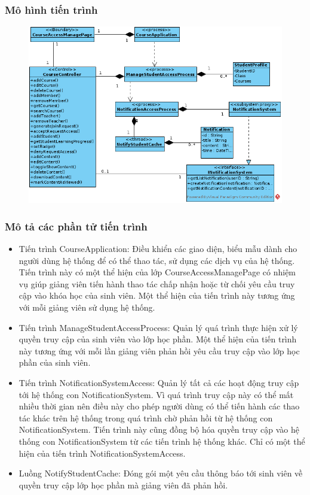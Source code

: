 \documentclass[./../main.tex]{subfiles}
\begin{document}
\subsubsection{Mô hình tiến trình}

\begin{figure}[H]
	\centering
	\includegraphics[width=\linewidth]{./images/pv_manage_studentactivity.png}
\end{figure}

\subsubsection{Mô tả các phần tử tiến trình}
\begin{itemize}
	\item Tiến trình CourseApplication: Điều khiển các giao diện, biểu mẫu dành cho người dùng hệ thống để có thể thao tác, sử dụng các dịch vụ của hệ thống. Tiến trình này có một thể hiện của lớp CourseAccessManagePage có nhiệm vụ giúp giảng viên tiến hành thao tác chấp nhận hoặc từ chối yêu cầu truy cập vào khóa học của sinh viên.
	Một thể hiện của tiến trình này tương ứng với mỗi giảng viên sử dụng hệ thống.
	\item Tiến trình ManageStudentAccessProcess: Quản lý quá trình thực hiện xử lý quyền truy cập của sinh viên vào lớp học phần.
	Một thể hiện của tiến trình này tương ứng với mỗi lần giảng viên phản hồi yêu cầu truy cập vào lớp học phần của sinh viên.
	\item Tiến trình NotificationSystemAccess: Quản lý tất cả các hoạt động truy cập tới hệ thống con NotificationSystem. Vì quá trình truy cập này có thể mất nhiều thời gian nên điều này cho phép người dùng có thể tiến hành các thao tác khác trên hệ thống trong quá trình chờ phản hồi từ hệ thống con NotificationSystem. Tiến trình này cũng đồng bộ hóa quyền truy cập vào hệ thống con NotificationSystem từ các tiến trình hệ thống khác.
	Chỉ có một thể hiện của tiến trình NotificationSystemAccess.
	\item Luồng NotifyStudentCache: Đóng gói một yêu cầu thông báo tới sinh viên về quyền truy cập lớp học phần mà giảng viên đã phản hồi.
\end{itemize}
\end{document}
